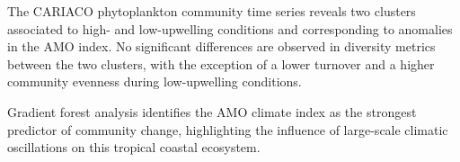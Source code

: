\documentclass[draft]{agujournal2019}
\begin{document}






\begin{keypoints}
\item The CARIACO phytoplankton community time series reveals two clusters associated to high- and low-upwelling conditions and corresponding to anomalies in the AMO index. 
\index No significant differences are observed in diversity metrics between the two clusters, with the exception of a lower turnover and a higher community evenness during low-upwelling conditions.
\item Gradient forest analysis identifies the AMO climate index as the strongest predictor of community change, highlighting the influence of large-scale climatic oscillations on this tropical coastal ecosystem.
\end{keypoints}

%
%

%
%
\end{document}
